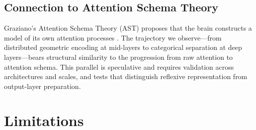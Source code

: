 \documentclass[11pt,a4paper]{article}
\begin{document}
\subsection{Connection to Attention Schema Theory}

Graziano's Attention Schema Theory (AST) proposes that the brain
constructs a model of its own attention processes
\citep{graziano2013consciousness}. The trajectory we observe---from
distributed geometric encoding at mid-layers to categorical separation
at deep layers---bears structural similarity to the progression from raw
attention to attention schema. This parallel is speculative and requires
validation across architectures and scales, and tests that distinguish
reflexive representation from output-layer preparation.

\section{Limitations}
\label{sec:limitations}
\end{document}

